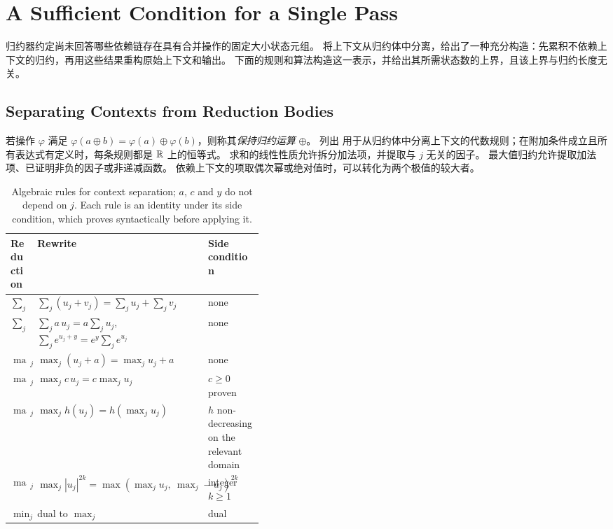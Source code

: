 \section{A Sufficient Condition for a Single Pass}
\label{sec:existence}

归约器约定尚未回答哪些依赖链存在具有合并操作的固定大小状态元组。
将上下文从归约体中分离，给出了一种充分构造：先累积不依赖上下文的归约，再用这些结果重构原始上下文和输出。
下面的规则和算法构造这一表示，并给出其所需状态数的上界，且该上界与归约长度无关。

\subsection{Separating Contexts from Reduction Bodies}
\label{sec:freeing}

若操作 $\varphi$ 满足 $\varphi(a\oplus b)=\varphi(a)\oplus\varphi(b)$，则称其\emph{保持归约运算} $\oplus$。
 列出 \sys 用于从归约体中分离上下文的代数规则；在附加条件成立且所有表达式有定义时，每条规则都是 $\mathbb{R}$ 上的恒等式。
求和的线性性质允许拆分加法项，并提取与 $j$ 无关的因子。
最大值归约允许提取加法项、已证明非负的因子或非递减函数。
依赖上下文的项取偶次幂或绝对值时，可以转化为两个极值的较大者。

\begin{table}[t]
\footnotesize
\caption{Algebraic rules for context separation; $a$, $c$ and $y$ do not depend on $j$. Each rule is an identity under its side condition, which \sys proves syntactically before applying it.}
\label{tab:rules}
\begin{tabular}{@{}llp{0.42\linewidth}@{}}
\toprule
\textbf{Reduction} & \textbf{Rewrite} & \textbf{Side condition}\\
\midrule
$\sum_j$ & $\sum_j (u_j+v_j)=\sum_j u_j+\sum_j v_j$ & none\\
$\sum_j$ & $\sum_j a\,u_j=a\sum_j u_j$, \ $\sum_j e^{u_j+y}=e^{y}\sum_j e^{u_j}$ & none\\
$\max_j$ & $\max_j (u_j+a)=\max_j u_j+a$ & none\\
$\max_j$ & $\max_j c\,u_j=c\max_j u_j$ & $c\ge 0$ proven\\
$\max_j$ & $\max_j h(u_j)=h(\max_j u_j)$ & $h$ non-decreasing on the relevant domain\\
$\max_j$ & $\max_j |u_j|^{2k}=\max(\max_j u_j,\ \max_j -u_j)^{2k}$ & integer $k\ge1$\\
$\min_j$ & dual to $\max_j$ & dual\\
\bottomrule
\end{tabular}
\end{table}

